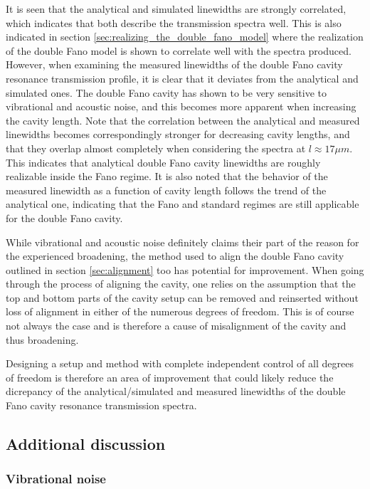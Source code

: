 It is seen that the analytical and simulated linewidths are strongly correlated, which indicates that both describe the transmission spectra well. This is also indicated in section \ref{sec:realizing_the_double_fano_model} where the realization of the double Fano model is shown to correlate well with the spectra produced. However, when examining the measured linewidths of the double Fano cavity resonance transmission profile, it is clear that it deviates from the analytical and simulated ones. The double Fano cavity has shown to be very sensitive to vibrational and acoustic noise, and this becomes more apparent when increasing the cavity length. Note that the correlation between the analytical and measured linewidths becomes correspondingly stronger for decreasing cavity lengths, and that they overlap almost completely when considering the spectra at $l \approx 17 \mu m$. This indicates that analytical double Fano cavity linewidths are roughly realizable inside the Fano regime. It is also noted that the behavior of the measured linewidth as a function of cavity length follows the trend of the analytical one, indicating that the Fano and standard regimes are still applicable for the double Fano cavity. 

While vibrational and acoustic noise definitely claims their part of the reason for the experienced broadening, the method used to align the double Fano cavity outlined in section \ref{sec:alignment} too has potential for improvement. When going through the process of aligning the cavity, one relies on the assumption that the top and bottom parts of the cavity setup can be removed and reinserted without loss of alignment in either of the numerous degrees of freedom. This is of course not always the case and is therefore a cause of misalignment of the cavity and thus broadening. 

Designing a setup and method with complete independent control of all degrees of freedom is therefore an area of improvement that could likely reduce the dicrepancy of the analytical/simulated and measured linewidths of the double Fano cavity resonance transmission spectra.

\subsection{Additional discussion}\label{sec:additional_discussion}

\subsubsection{Vibrational noise}

